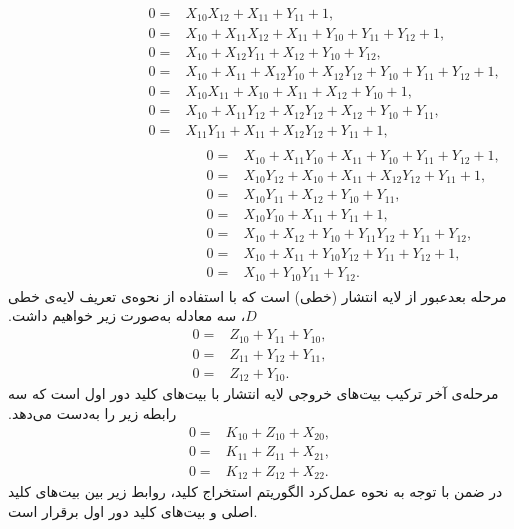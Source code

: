 {\small \begin{align*}
\begin{split}
0 =& X_{10} X_{12} + X_{11} + Y_{11} + 1, \\
0 =& X_{10} + X_{11} X_{12} + X_{11} + Y_{10} + Y_{11} + Y_{12} + 1, \\
0 =& X_{10} + X_{12} Y_{11} + X_{12} + Y_{10} + Y_{12},\\
0 =& X_{10} + X_{11} + X_{12} Y_{10} + X_{12} Y_{12} + Y_{10} + Y_{11} + Y_{12} + 1,\\
0 =& X_{10} X_{11} + X_{10} + X_{11} + X_{12} + Y_{10} + 1,\\
0 =& X_{10} + X_{11} Y_{12} + X_{12} Y_{12} + X_{12} + Y_{10} + Y_{11},\\
0 =& X_{11} Y_{11} + X_{11} + X_{12} Y_{12} + Y_{11} + 1,\\
\end{split}
\begin{split}
0 =& X_{10} + X_{11} Y_{10} + X_{11} + Y_{10} + Y_{11} + Y_{12} + 1,\\ 
0 =& X_{10} Y_{12} + X_{10} + X_{11} + X_{12} Y_{12} + Y_{11} + 1,\\
0 =& X_{10} Y_{11} + X_{12} + Y_{10} + Y_{11},\\
0 =& X_{10} Y_{10} + X_{11} + Y_{11} + 1,\\
0 =& X_{10} + X_{12} + Y_{10} + Y_{11} Y_{12} + Y_{11} + Y_{12},\\
0 =& X_{10} + X_{11} + Y_{10} Y_{12} + Y_{11} + Y_{12} + 1,\\
0 =& X_{10} + Y_{10} Y_{11} + Y_{12}.
\end{split}
\end{align*}}
مرحله بعدعبور از لایه انتشار (خطی) است که با استفاده از نحوه‌ی تعریف لایه‌ی خطی 
$D$،
 سه معادله به‌صورت زیر خواهیم داشت. 
{\small \begin{align*}
	0 =& Z_{10} + Y_{11} + Y_{10},\\
	0 =& Z_{11} + Y_{12} + Y_{11},\\
	0 =& Z_{12} + Y_{10}.
\end{align*}}
مرحله‌ی آخر ترکیب بیت‌های خروجی لایه انتشار با بیت‌های کلید دور اول است که سه رابطه‌ زیر را به‌دست می‌دهد. 
{\small \begin{align*}
	0 =& K_{10} + Z_{10} + X_{20},\\
	0 =& K_{11} + Z_{11} + X_{21},\\
	0 =& K_{12} + Z_{12} + X_{22}.
\end{align*}}
در ضمن با توجه به نحوه عمل‌کرد الگوریتم استخراج کلید، روابط زیر بین بیت‌های کلید اصلی و بیت‌های کلید دور اول برقرار است. 
